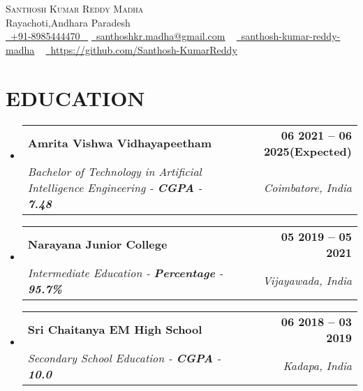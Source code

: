 \documentclass[letterpaper,11pt]{article}
\makeatletter
\newcommand{\resumeSubheading}[4]{
  \vspace{-2pt}\item
    \begin{tabular*}{1.0\textwidth}[t]{l@{\extracolsep{\fill}}r}
      \textbf{\large#1} & \textbf{\small #2} \\
      \textit{\large#3} & \textit{\small #4} \\
      
    \end{tabular*}\vspace{-7pt}
}
\newcommand{\resumeSubHeadingListStart}{\begin{itemize}[leftmargin=0.0in, label={}]}
\newcommand{\resumeSubHeadingListEnd}{\end{itemize}}
\makeatother
\begin{document}


\begin{center}
    {\Huge \scshape Santhosh Kumar Reddy Madha} \\ \vspace{1pt}
    Rayachoti,Andhara Paradesh \\ \vspace{1pt}
    \small \href{tel:+xxxxxxxxxxxx}{ \raisebox{-0.1\height}\faPhone\ \underline{+91-8985444470} ~} \href{mailto:yourname@gmail.com}{\raisebox{-0.2\height}\faEnvelope\  \underline{santhoshkr.madha@gmail.com}} ~ 
    \href{https://www.linkedin.com/in/santhosh-kumar-reddy-madha/}{\raisebox{-0.2\height}\faLinkedinSquare\ \underline{santhosh-kumar-reddy-madha}}  ~
    \href{https://github.com/yourid}{\raisebox{-0.2\height}\faGithub\ \underline{https://github.com/Santhosh-KumarReddy}} ~
\end{center}


\section{EDUCATION}
  \resumeSubHeadingListStart
    \resumeSubheading
      {Amrita Vishwa Vidhayapeetham}{06 2021 -- 06 2025(Expected)}
      {Bachelor of Technology in Artificial Intelligence Engineering - \textbf{CGPA} - \textbf{7.48}}{Coimbatore, India}
  \resumeSubHeadingListEnd
  
  \resumeSubHeadingListStart
    \resumeSubheading
      {Narayana Junior College}{05 2019 -- 05 2021}
      {Intermediate Education   - \textbf{Percentage} - \textbf{95.7\%}}{Vijayawada, India}
  \resumeSubHeadingListEnd

    \resumeSubHeadingListStart
    \resumeSubheading
      {Sri Chaitanya EM High School}{06 2018 -- 03 2019}
      {Secondary School Education   - \textbf{CGPA} - \textbf{10.0}}{Kadapa, India}
  \resumeSubHeadingListEnd

\end{document}
